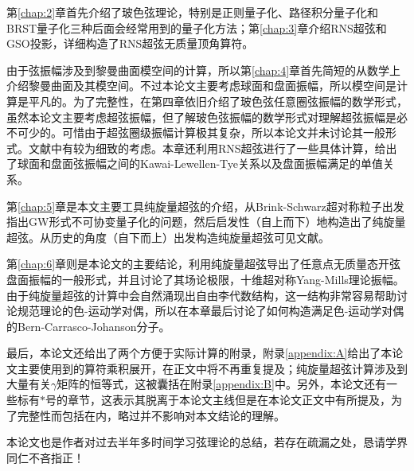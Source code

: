 第\ref{chap:2}章首先介绍了玻色弦理论，特别是正则量子化、路径积分量子化和BRST量子化三种后面会经常用到的量子化方法；第\ref{chap:3}章介绍RNS超弦和GSO投影，详细构造了RNS超弦无质量顶角算符。

由于弦振幅涉及到黎曼曲面模空间的计算，所以第\ref{chap:4}章首先简短的从数学上介绍黎曼曲面及其模空间。不过本论文主要考虑球面和盘面振幅，所以模空间是计算是平凡的。为了完整性，在第四章依旧介绍了玻色弦任意圈弦振幅的数学形式，虽然本论文主要考虑超弦振幅，但了解玻色弦振幅的数学形式对理解超弦振幅是必不可少的。可惜由于超弦圈级振幅计算极其复杂，所以本论文并未讨论其一般形式。文献\cite{Witten:2012bh,DHoker:2002hof}中有较为细致的考虑。本章还利用RNS超弦进行了一些具体计算，给出了球面和盘面弦振幅之间的Kawai-Lewellen-Tye关系以及盘面振幅满足的单值关系。

第\ref{chap:5}章是本文主要工具纯旋量超弦的介绍，从Brink-Schwarz超对称粒子出发指出GW形式不可协变量子化的问题，然后启发性（自上而下）地构造出了纯旋量超弦。从历史的角度（自下而上）出发构造纯旋量超弦可见文献\cite{Berkovits:2002zk,Mafra:2008gkx}。

第\ref{chap:6}章则是本论文的主要结论，利用纯旋量超弦导出了任意点无质量态开弦盘面振幅的一般形式，并且讨论了其场论极限，十维超对称Yang-Mills理论振幅。由于纯旋量超弦的计算中会自然涌现出自由李代数结构，这一结构非常容易帮助讨论规范理论的色-运动学对偶，所以在本章最后讨论了如何构造满足色-运动学对偶的Bern-Carrasco-Johanson分子\cite{Mafra:2011kj}。

最后，本论文还给出了两个方便于实际计算的附录，附录\ref{appendix:A}给出了本论文主要使用到的算符乘积展开，在正文中将不再重复提及；纯旋量超弦计算涉及到大量有关$\gamma$矩阵的恒等式，这被囊括在附录\ref{appendix:B}中。另外，本论文还有一些标有$*$号的章节，这表示其脱离于本论文主线但是在本论文正文中有所提及，为了完整性而包括在内，略过并不影响对本文结论的理解。

本论文也是作者对过去半年多时间学习弦理论的总结，若存在疏漏之处，恳请学界同仁不吝指正！